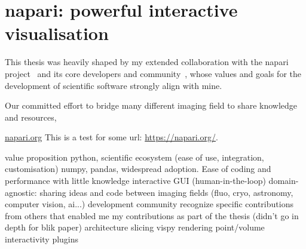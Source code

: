 \chapter{napari: powerful interactive visualisation}

This thesis was heavily shaped by my extended collaboration with the napari project~\cite{thenaparicommunityNapariMultidimensionalImage2024} and its core developers and community~\cite{thenaparicommunityCommunityNapari2024}, whose values and goals for the development of scientific software strongly align with mine.

Our committed effort to bridge many different imaging field to share knowledge and resources, 

\href{https://napari.org/}{napari.org}
This is a test for some url: \url{https://napari.org/}.

\begin{outline}
\1 value proposition
    \2 python, scientific ecosystem (ease of use, integration, customisation)
    \2 numpy, pandas, widespread adoption. Ease of coding and performance with little knowledge
    \2 interactive GUI (human-in-the-loop)
    \2 domain-agnostic: sharing ideas and code between imaging fields (fluo, cryo, astronomy, computer vision, ai...)
\1 development
    \2 community
        \3 recognize specific contributions from others that enabled me
    \2 my contributions as part of the thesis (didn't go in depth for blik paper)
        \3 architecture
        \3 slicing
        \3 vispy rendering
        \3 point/volume interactivity
        \3 plugins
\end{outline}
